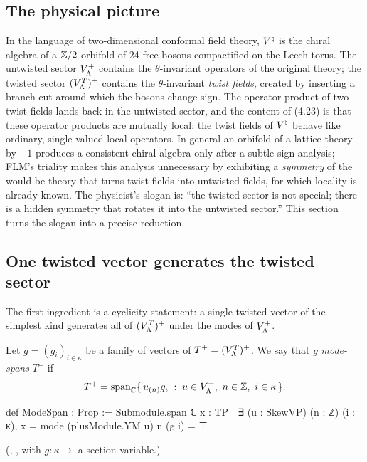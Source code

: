 \subsection{The physical picture}

In the language of two-dimensional conformal field theory, ${V^{\natural}}$ is the chiral algebra of a
${\mathbb{Z}}/2$-orbifold of 24 free bosons compactified on the Leech torus.  The untwisted sector
$V_{\Lambda}^+$ contains the $\theta$-invariant operators of the original theory; the twisted sector
$(V_{\Lambda}^T)^+$ contains the $\theta$-invariant \emph{twist fields}, created by inserting a branch
cut around which the bosons change sign.  The operator product of two twist fields lands back in
the untwisted sector, and the content of (4.23) is that these operator products are mutually local:
the twist fields of ${V^{\natural}}$ behave like ordinary, single-valued local operators.  In general an
orbifold of a lattice theory by $-1$ produces a consistent chiral algebra only after a
subtle sign analysis; FLM's triality makes this analysis unnecessary by exhibiting a
\emph{symmetry} of the would-be theory that turns twist fields into untwisted fields, for which
locality is already known.  The physicist's slogan is: ``the twisted sector is not special; there is
a hidden symmetry that rotates it into the untwisted sector.''  This section turns the slogan into
a precise reduction.

\subsection{One twisted vector generates the twisted sector}

The first ingredient is a cyclicity statement: a single twisted vector of the simplest kind
generates all of $(V_{\Lambda}^T)^+$ under the modes of $V_{\Lambda}^+$.

\begin{definition}\label{ch14:def:modespan}
Let $g=(g_i)_{i\in\kappa}$ be a family of vectors of $T^+=(V_{\Lambda}^T)^+$.  We say that $g$
\emph{mode-spans} $T^+$ if
\begin{equation*}
  T^{+}=\operatorname{span}_{\mathbb{C}}\{\,u_{(n)}g_i\;:\;u\in V_{\Lambda}^+,\ n\in{\mathbb{Z}},\ i\in\kappa\,\}.
\end{equation*}
\end{definition}

\begin{leancode}
def ModeSpan : Prop :=
  Submodule.span ℂ {x : TP | ∃ (u : SkewVP) (n : ℤ) (i : κ), x = mode (plusModule.YM u) n (g i)} = ⊤
\end{leancode}
(, , with $g:\kappa\to$
 a section variable.)

